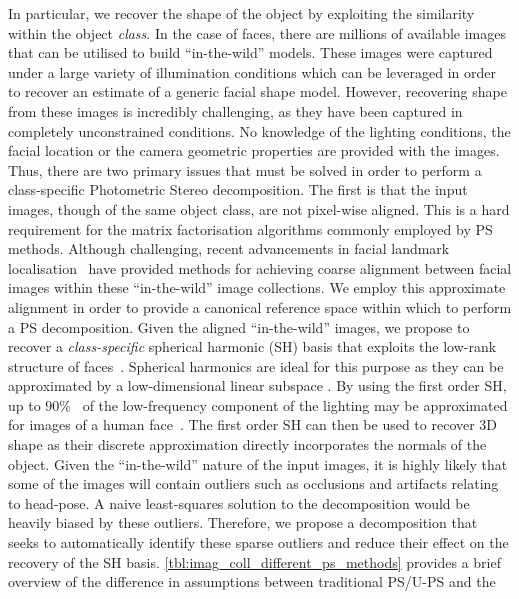 In particular, we recover the shape of the object by exploiting the
similarity within the object \textit{class}.
In the case of faces, there are millions of
available images that can be utilised to build ``in-the-wild'' models. These images
were captured under a large variety of illumination conditions which can be
leveraged in order to recover an estimate of a generic facial shape model.
However, recovering shape from these images is incredibly challenging, as they have been
captured in completely unconstrained conditions. No knowledge of the lighting
conditions, the facial location or the camera geometric properties are provided
with the images. Thus, there are two primary issues that must be solved in
order to perform a class-specific Photometric Stereo decomposition. The first
is that the input images, though of the same object class, are not
pixel-wise aligned. This is a hard requirement for the matrix factorisation
algorithms commonly employed by PS methods. Although challenging, recent
advancements in facial landmark localisation~\cite{cootes2001active} have
provided methods for achieving coarse alignment between facial images within
these ``in-the-wild'' image collections. We employ this approximate alignment
in order to provide a canonical reference space within which to perform
a PS decomposition. Given the aligned ``in-the-wild'' images, we propose to
recover a \textit{class-specific} spherical harmonic (SH)
basis that exploits the low-rank structure of
faces~\cite{georghiades2001fromfew,Basri:2003ie}. Spherical harmonics are ideal for
this purpose as they can be approximated by a low-dimensional linear subspace
\cite{Basri:2003ie,ramamoorthi2001relationship}.
By using the first order SH, up to $90\%$~\cite{yuille1999determining} of
the low-frequency component of the lighting may be approximated for images
of a human face~\cite{Basri:2003ie,%
basri2007photometric,yuille1999determining}. The first order SH
can then be used to recover 3D shape as their discrete approximation directly
incorporates the normals of the object. Given the ``in-the-wild'' nature of
the input images, it is highly likely that some of the images will contain
outliers such as occlusions and artifacts relating to head-pose. A naive
least-squares solution to the decomposition would be heavily biased
by these outliers. Therefore, we propose a decomposition that seeks to
automatically identify these sparse outliers and reduce their effect on
the recovery of the SH basis.
\cref{tbl:imag_coll_different_ps_methods} provides a brief
overview of the difference in assumptions between traditional PS/U-PS and the
